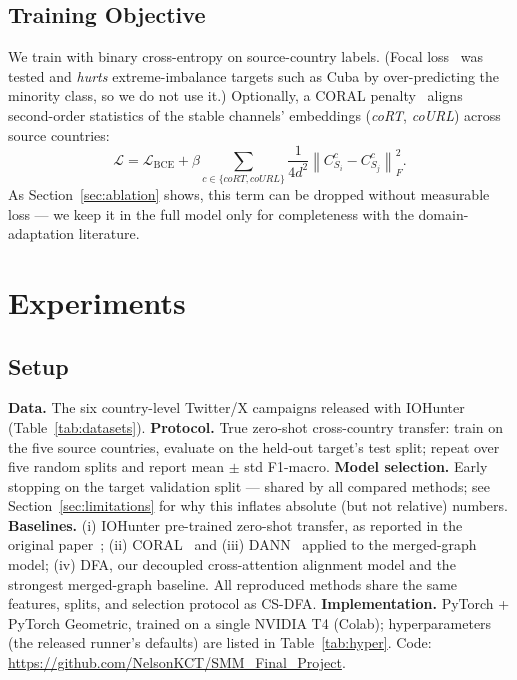 \documentclass[conference]{IEEEtran}
\newcommand{\method}{CS-DFA}
\begin{document}
\subsection{Training Objective}
We train with binary cross-entropy on source-country labels. (Focal
loss~\cite{lin2017focal} was tested and \emph{hurts} extreme-imbalance
targets such as Cuba by over-predicting the minority class, so we do not use
it.) Optionally, a CORAL penalty~\cite{sun2016coral} aligns second-order
statistics of the stable channels' embeddings (\textit{coRT},
\textit{coURL}) across source countries:
\begin{equation}
\mathcal{L} = \mathcal{L}_{\mathrm{BCE}}
+ \beta \sum_{c \in \{\textit{coRT},\textit{coURL}\}}
\frac{1}{4d^2}\left\lVert C^c_{S_i} - C^c_{S_j} \right\rVert_F^2 .
\end{equation}
As Section~\ref{sec:ablation} shows, this term can be dropped without
measurable loss --- we keep it in the full model only for completeness with
the domain-adaptation literature.

\section{Experiments}
\label{sec:results}

\subsection{Setup}
\textbf{Data.} The six country-level Twitter/X campaigns released with
IOHunter~\cite{minici2025iohunter} (Table~\ref{tab:datasets}).
\textbf{Protocol.} True zero-shot cross-country transfer: train on the five
source countries, evaluate on the held-out target's test split; repeat over
five random splits and report mean $\pm$ std F1-macro.
\textbf{Model selection.} Early stopping on the target validation split ---
shared by all compared methods; see Section~\ref{sec:limitations} for why
this inflates absolute (but not relative) numbers.
\textbf{Baselines.} (i) IOHunter pre-trained zero-shot transfer, as reported
in the original paper~\cite{minici2025iohunter}; (ii)
CORAL~\cite{sun2016coral} and (iii) DANN~\cite{ganin2016dann} applied to the
merged-graph model; (iv) DFA, our decoupled cross-attention alignment model
and the strongest merged-graph baseline. All reproduced methods share the
same features, splits, and selection protocol as \method{}.
\textbf{Implementation.} PyTorch + PyTorch Geometric, trained on a single
NVIDIA T4 (Colab); hyperparameters (the released runner's defaults) are
listed in Table~\ref{tab:hyper}. Code:
\url{https://github.com/NelsonKCT/SMM_Final_Project}.
\end{document}
